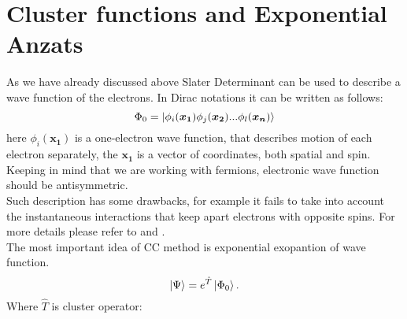 \documentclass[twoside,english]{uiofysmaster}
\theoremstyle{definition}
\begin{document}
\section{Cluster functions and Exponential Anzats} 
As we have already discussed above Slater Determinant can be used to describe a wave function of the electrons. In Dirac notations it can be written as follows:
\begin{equation}
\Phi_0 =  \ket{\phi_i(\bm{x_1})\phi_j(\bm{x_2}) ...\phi_l(\bm{x_n})}
\end{equation}
here $\phi_i(\bm{x_1})$ is a one-electron wave function, that describes motion of each electron separately, the $\bm{x_1}$ is a vector of coordinates, both spatial and spin. \\
Keeping in mind that we are working with fermions, electronic wave function should be antisymmetric. \\
Such description has some drawbacks, for example it fails to take into account the instantaneous interactions that keep apart electrons with opposite spins. For more details please refer to  \cite{bartlettApplicationsPostHartree2007} and \cite{ModernQuantumChemistry}. \\
The most important idea of CC method is exponential exopantion of wave function. 
\begin{equation}\label{eq:exponential ansatz}
\ket{\Psi}=e^{\hat{T}}\ket{\Phi_0}.
\end{equation}
Where $\hat{T}$ is cluster operator:
\end{document}
